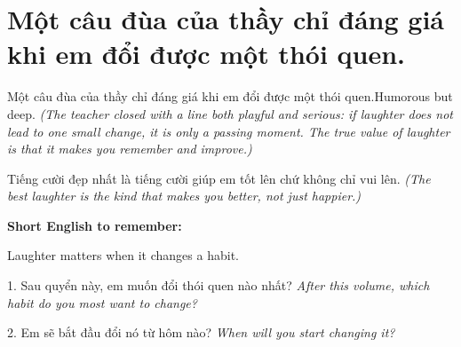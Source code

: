 \section{Một câu đùa của thầy chỉ đáng giá khi em đổi được một thói quen.}
\begin{truyen}{Một câu đùa của thầy chỉ đáng giá khi em đổi được một thói quen.}{Humorous but deep.}
\textit{(The teacher closed with a line both playful and serious: if laughter does not lead to one small change, it is only a passing moment. The true value of laughter is that it makes you remember and improve.)}
\end{truyen}

\begin{baihoc}
Tiếng cười đẹp nhất là tiếng cười giúp em tốt lên chứ không chỉ vui lên.
\textit{(The best laughter is the kind that makes you better, not just happier.)}
\end{baihoc}

\begin{ghinhoanh}
\textbf{Short English to remember:}

Laughter matters when it changes a habit.

\end{ghinhoanh}

\begin{tuhocnhanh}
1. Sau quyển này, em muốn đổi thói quen nào nhất? \textit{After this volume, which habit do you most want to change?}

2. Em sẽ bắt đầu đổi nó từ hôm nào? \textit{When will you start changing it?}
\end{tuhocnhanh}
\ngancach